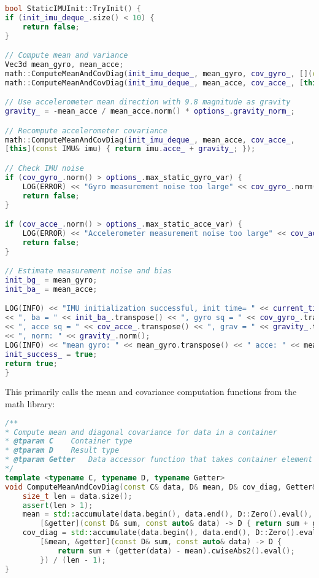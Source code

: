 \begin{lstlisting}[language=c++,caption=src/ch3/static\_imu\_init.cc]
bool StaticIMUInit::TryInit() {
if (init_imu_deque_.size() < 10) {
	return false;
}

// Compute mean and variance
Vec3d mean_gyro, mean_acce;
math::ComputeMeanAndCovDiag(init_imu_deque_, mean_gyro, cov_gyro_, [](const IMU& imu) { return imu.gyro_; });
math::ComputeMeanAndCovDiag(init_imu_deque_, mean_acce, cov_acce_, [this](const IMU& imu) { return imu.acce_; });

// Use accelerometer mean direction with 9.8 magnitude as gravity
gravity_ = -mean_acce / mean_acce.norm() * options_.gravity_norm_;

// Recompute accelerometer covariance
math::ComputeMeanAndCovDiag(init_imu_deque_, mean_acce, cov_acce_,
[this](const IMU& imu) { return imu.acce_ + gravity_; });

// Check IMU noise
if (cov_gyro_.norm() > options_.max_static_gyro_var) {
	LOG(ERROR) << "Gyro measurement noise too large" << cov_gyro_.norm() << " > " << options_.max_static_gyro_var;
	return false;
}

if (cov_acce_.norm() > options_.max_static_acce_var) {
	LOG(ERROR) << "Accelerometer measurement noise too large" << cov_acce_.norm() << " > " << options_.max_static_acce_var;
	return false;
}

// Estimate measurement noise and bias
init_bg_ = mean_gyro;
init_ba_ = mean_acce;

LOG(INFO) << "IMU initialization successful, init time= " << current_time_ - init_start_time_ << ", bg = " << init_bg_.transpose()
<< ", ba = " << init_ba_.transpose() << ", gyro sq = " << cov_gyro_.transpose()
<< ", acce sq = " << cov_acce_.transpose() << ", grav = " << gravity_.transpose()
<< ", norm: " << gravity_.norm();
LOG(INFO) << "mean gyro: " << mean_gyro.transpose() << " acce: " << mean_acce.transpose();
init_success_ = true;
return true;
}
\end{lstlisting}

This primarily calls the mean and covariance computation functions from the math library:

\begin{lstlisting}[language=c++,caption=src/common/math\_utils.h]
/**
* Compute mean and diagonal covariance for data in a container
* @tparam C    Container type
* @tparam D    Result type
* @tparam Getter   Data accessor function that takes container element type and returns D type
*/
template <typename C, typename D, typename Getter>
void ComputeMeanAndCovDiag(const C& data, D& mean, D& cov_diag, Getter&& getter) {
	size_t len = data.size();
	assert(len > 1);
	mean = std::accumulate(data.begin(), data.end(), D::Zero().eval(),
		[&getter](const D& sum, const auto& data) -> D { return sum + getter(data); }) / len;
	cov_diag = std::accumulate(data.begin(), data.end(), D::Zero().eval(),
		[&mean, &getter](const D& sum, const auto& data) -> D {
			return sum + (getter(data) - mean).cwiseAbs2().eval();
		}) / (len - 1);
}
\end{lstlisting}

